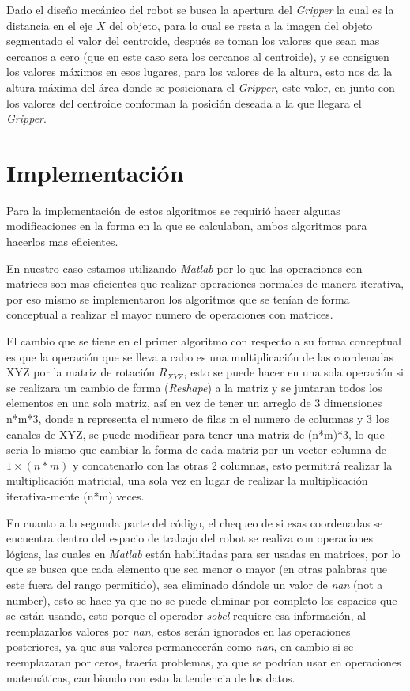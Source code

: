     Dado el diseño mecánico del robot se busca la apertura del \textit{Gripper} la cual es la distancia en el eje $X$ del objeto, para lo cual se resta a la imagen del objeto segmentado el valor del centroide, después se toman los valores que sean mas cercanos a cero (que en este caso sera los cercanos al centroide), y  se consiguen los valores máximos en esos lugares, para los valores de la altura,  esto nos da la altura máxima del área donde se posicionara el \textit{Gripper}, este valor, en junto con los valores del centroide conforman la posición deseada a la que llegara el \textit{Gripper}.
    
    \section{Implementación}
    
    Para la implementación de estos algoritmos se requirió hacer algunas modificaciones en la forma en la que se calculaban, ambos algoritmos para hacerlos mas eficientes.
    
    En nuestro caso estamos utilizando \textit{Matlab} por lo que las operaciones con matrices son mas eficientes que realizar operaciones normales de manera iterativa, por eso mismo se implementaron los algoritmos que se tenían de forma conceptual a realizar el mayor numero de operaciones con matrices. 
    
    El cambio que se tiene en el primer algoritmo con respecto a su forma conceptual es que la operación que se lleva a cabo es una multiplicación de las coordenadas XYZ por la matriz de rotación $R_{XYZ}$, esto se puede hacer en una sola operación si se realizara un cambio de forma (\textit{Reshape}) a la matriz y se juntaran todos los elementos en una sola matriz, así en vez de tener un arreglo de 3 dimensiones n*m*3, donde n representa el numero de filas m el numero de columnas y 3 los canales de XYZ, se puede modificar para tener una matriz de (n*m)*3, lo que seria lo mismo que cambiar la forma de cada matriz por un vector columna de $1\times(n*m)$ y concatenarlo con las otras 2 columnas, esto permitirá realizar la multiplicación matricial, una sola vez en lugar de realizar la multiplicación iterativa-mente (n*m) veces. 
    
    En cuanto a la segunda parte del código, el chequeo de si esas coordenadas se encuentra dentro del espacio de trabajo del robot se realiza con operaciones lógicas, las cuales en \textit{Matlab} están habilitadas para ser usadas en matrices, por lo que se busca que cada elemento que sea menor o mayor (en otras palabras que este fuera del  rango permitido), sea eliminado dándole un valor de \textit{nan} (not a number), esto se hace ya que no se puede eliminar por completo los espacios que se están usando, esto porque el operador \textit{sobel} requiere esa información, al reemplazarlos valores por \textit{nan}, estos serán ignorados en las operaciones posteriores, ya que sus valores permanecerán como \textit{nan}, en cambio si se reemplazaran por ceros, traería problemas, ya que se podrían usar en operaciones matemáticas, cambiando con esto la tendencia de los datos.
    
